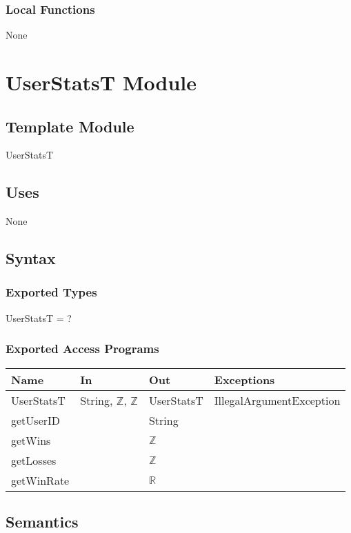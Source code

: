 \documentclass[12pt, titlepage]{article}
\begin{document}
\subsubsection{Local Functions}

None

\newpage
\section{UserStatsT Module}  \label{UserStatsT}
\subsection{Template Module}
UserStatsT
\subsection{Uses}
None

\subsection{Syntax}
\subsubsection{Exported Types}
UserStatsT = ?

\subsubsection{Exported Access Programs}

\begin{center}
\begin{tabular}{ |  p{4cm} | p{3cm} |  p{3cm} | p{5cm} | }
\hline
\textbf{Name} & \textbf{In} & \textbf{Out} & \textbf{Exceptions} \\
\hline
UserStatsT & String, $\mathbb{Z}$, $\mathbb{Z}$ & UserStatsT & IllegalArgumentException \\
getUserID & & String & \\
getWins & & $\mathbb{Z}$  & \\
getLosses & & $\mathbb{Z}$ & \\
getWinRate & & $\mathbb{R}$ & \\

\hline
\end{tabular}
\end{center}

\subsection{Semantics}
\end{document}
